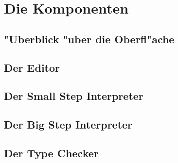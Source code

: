
\chapter{Die Komponenten}

\section{"Uberblick "uber die Oberfl"ache}

\section{Der Editor}

\section{Der Small Step Interpreter}

\section{Der Big Step Interpreter}

\section{Der Type Checker}



